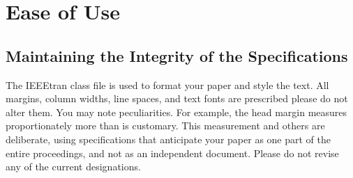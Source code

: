 \section{Ease of Use}

    \subsection{Maintaining the Integrity of the Specifications}

        The IEEEtran class file is used to format your paper and style the text.
        All margins, column widths, line spaces, and text fonts are prescribed please do not alter them.
        You may note peculiarities.
        For example, the head margin measures proportionately more than is customary.
        This measurement and others are deliberate, using specifications that anticipate your paper as one part of the entire proceedings, and not as an independent document.
        Please do not revise any of the current designations.
